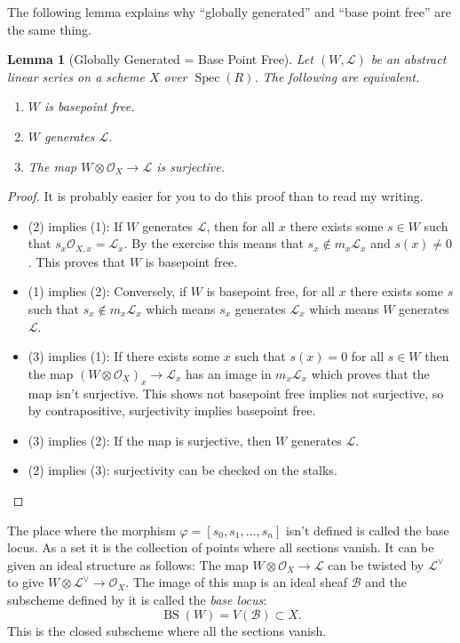 \documentclass[12pt]{article}
\numberwithin{equation}{section}
\newtheorem{lemma}[theorem]{Lemma}
\theoremstyle{definition}
\theoremstyle{remark}
\newcommand{\Ocal}{\mathcal{O}}
\newcommand{\Spec}{\operatorname{Spec}}
\newcommand{\Lcal}{\mathcal{L}}
\newcommand{\BS}{\operatorname{BS}}
\begin{document}
The following lemma explains why ``globally generated'' and ``base point free'' are the same thing. 
\begin{lemma}[Globally Generated = Base Point Free]
Let $(W,\Lcal)$ be an abstract linear series on a scheme $X$ over $\Spec(R)$. 
The following are equivalent. 
	\begin{enumerate}
		\item $W$ is basepoint free.
		\item $W$ generates $\Lcal$.
		\item The map $W\otimes \Ocal_X \to \Lcal$ is surjective. 
	\end{enumerate}
\end{lemma}
\begin{proof}
	It is probably easier for you to do this proof than to read my writing. 
	
	\begin{itemize}
	\item (2) implies (1): If $W$ generates $\Lcal$, then for all $x$ there exists some $s\in W$ such that $s_x \Ocal_{X,x} = \Lcal_x$. 
	By the exercise this means that $s_x \notin m_x \Lcal_x$ and $s(x) \neq 0$. 
	This proves that $W$ is basepoint free.  
	
	\item (1) implies (2): Conversely, if $W$ is basepoint free, for all $x$ there exists some $s$ such that $s_x \notin m_x\Lcal_x$ which means $s_x$ generates $\Lcal_x$ which means $W$ generates $\Lcal$. 
	
	\item (3) implies (1): If there exists some $x$ such that $s(x)=0$ for all $s\in W$ then the map $(W\otimes \Ocal_X)_x \to \Lcal_x$ has an image in $m_x\Lcal_x$ which proves that the map isn't surjective. 
	This shows not basepoint free implies not surjective, so by contrapositive, surjectivity implies basepoint free. 
	
	\item (3) implies (2): If the map is surjective, then $W$ generates $\Lcal$.
	
	\item (2) implies (3): surjectivity can be checked on the stalks. 
	\end{itemize}
\end{proof}
The place where the morphism $\varphi=[s_0,s_1,\ldots,s_n]$ isn't defined is called the base locus.
As a set it is the collection of points where all sections vanish. 
It can be given an ideal structure as follows:
The map $W\otimes \Ocal_X \to \Lcal$ can be twisted by $\Lcal^{\vee}$ to give $W\otimes \Lcal^{\vee} \to \Ocal_X$.
The image of this map is an ideal sheaf $\mathcal{B}$ and the subscheme defined by it is called the \emph{base locus}:
$$ \BS(W) = V(\mathcal{B}) \subset X.$$
This is the closed subscheme where all the sections vanish.
\end{document}
